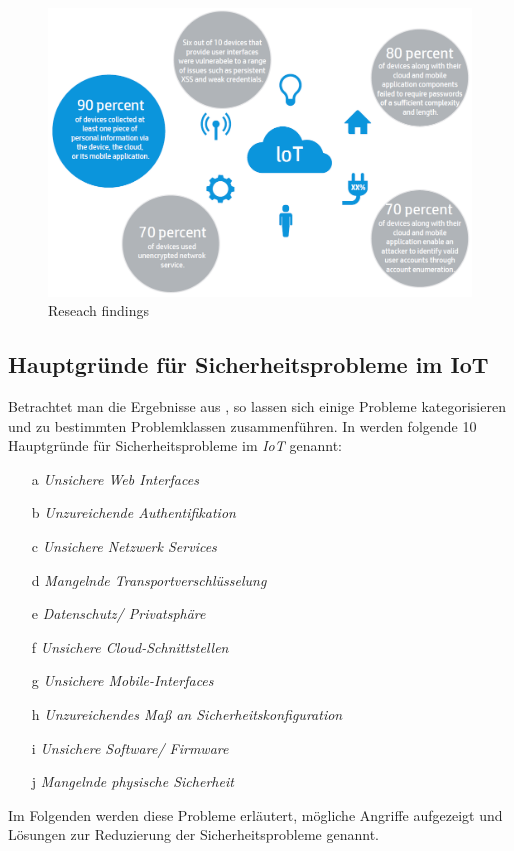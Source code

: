 \documentclass[conference]{IEEEtran}
\begin{document}
\begin{figure}[h]
\centering
  \includegraphics[width=1.0\columnwidth]{hp}
  \caption{Reseach findings}
  \label{fig:hpfind}
\end{figure}

\subsection{Hauptgründe für Sicherheitsprobleme im IoT}
Betrachtet man die Ergebnisse aus \cite{hpack}, so lassen sich einige Probleme kategorisieren und zu bestimmten Problemklassen zusammenführen. In \cite{owasp} werden folgende 10 Hauptgründe für Sicherheitsprobleme im \textit{IoT} genannt:
\begin{itemize}
  \item[a] \textit{Unsichere Web Interfaces} 
  \item[b] \textit{Unzureichende Authentifikation} 
  \item[c] \textit{Unsichere Netzwerk Services} 
  \item[d] \textit{Mangelnde Transportverschlüsselung} 
  \item[e] \textit{Datenschutz/ Privatsphäre} 
  \item[f] \textit{Unsichere Cloud-Schnittstellen} 
  \item[g] \textit{Unsichere Mobile-Interfaces} 
  \item[h] \textit{Unzureichendes Maß an Sicherheitskonfiguration} 
  \item[i] \textit{Unsichere Software/ Firmware} 
  \item[j] \textit{Mangelnde physische Sicherheit} \\
\end{itemize} 
Im Folgenden werden diese Probleme erläutert, mögliche Angriffe aufgezeigt und Lösungen zur Reduzierung der Sicherheitsprobleme genannt. \\
\end{document}
